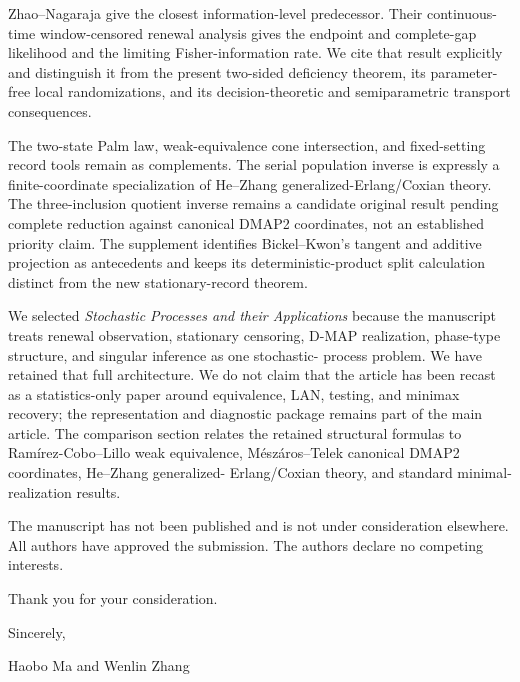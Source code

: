 \documentclass[11pt]{article}
\begin{document}
Zhao--Nagaraja give the closest information-level predecessor.  Their
continuous-time window-censored renewal analysis gives the endpoint and
complete-gap likelihood and the limiting Fisher-information rate.  We cite
that result explicitly and distinguish it from the present two-sided
deficiency theorem, its parameter-free local randomizations, and its
decision-theoretic and semiparametric transport consequences.

The two-state Palm law, weak-equivalence cone intersection, and fixed-setting
record tools remain as complements.  The serial population inverse is
expressly a finite-coordinate specialization of He--Zhang
generalized-Erlang/Coxian theory.  The three-inclusion quotient inverse remains
a candidate original result pending complete reduction against canonical
DMAP2 coordinates, not an established priority claim.  The supplement
identifies Bickel--Kwon's tangent and additive projection as antecedents and
keeps its deterministic-product split calculation distinct from the new
stationary-record theorem.

We selected \emph{Stochastic Processes and their Applications} because the
manuscript treats renewal observation, stationary censoring, D-MAP
realization, phase-type structure, and singular inference as one stochastic-
process problem.  We have retained that full architecture.  We do not claim
that the article has been recast as a statistics-only paper around equivalence,
LAN, testing, and minimax recovery; the representation and diagnostic package
remains part of the main article.  The comparison section relates the retained
structural formulas to Ram\'irez-Cobo--Lillo weak equivalence,
M\'esz\'aros--Telek canonical DMAP2 coordinates, He--Zhang generalized-
Erlang/Coxian theory, and standard minimal-realization results.

The manuscript has not been published and is not under consideration
elsewhere.  All authors have approved the submission.  The authors declare no
competing interests.

Thank you for your consideration.

Sincerely,

Haobo Ma and Wenlin Zhang
\end{document}

